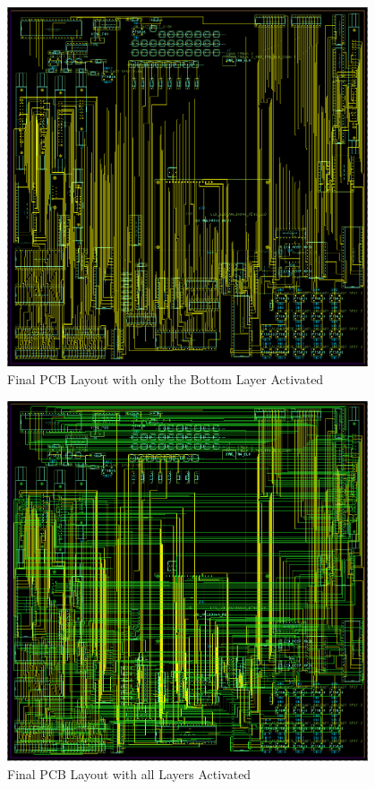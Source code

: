 \begin{appendices}
        \begin{figure}[ht]
            \begin{center}
                \includegraphics[width=0.95\textwidth]{figures/bottom.png}
                \caption{Final PCB Layout with only the Bottom Layer Activated} \label{fig:bottom}
            \end{center}
        \end{figure}

        \begin{figure}[ht]
            \begin{center}
                \includegraphics[width=0.95\textwidth]{figures/board.png}
                \caption{Final PCB Layout with all Layers Activated} \label{fig:board}
            \end{center}
        \end{figure}


\end{appendices}
